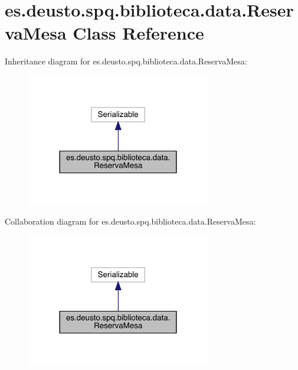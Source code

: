 \hypertarget{classes_1_1deusto_1_1spq_1_1biblioteca_1_1data_1_1_reserva_mesa}{}\section{es.\+deusto.\+spq.\+biblioteca.\+data.\+Reserva\+Mesa Class Reference}
\label{classes_1_1deusto_1_1spq_1_1biblioteca_1_1data_1_1_reserva_mesa}


Inheritance diagram for es.\+deusto.\+spq.\+biblioteca.\+data.\+Reserva\+Mesa\+:
\nopagebreak
\begin{figure}[H]
\begin{center}
\leavevmode
\includegraphics[width=228pt]{classes_1_1deusto_1_1spq_1_1biblioteca_1_1data_1_1_reserva_mesa__inherit__graph}
\end{center}
\end{figure}


Collaboration diagram for es.\+deusto.\+spq.\+biblioteca.\+data.\+Reserva\+Mesa\+:
\nopagebreak
\begin{figure}[H]
\begin{center}
\leavevmode
\includegraphics[width=228pt]{classes_1_1deusto_1_1spq_1_1biblioteca_1_1data_1_1_reserva_mesa__coll__graph}
\end{center}
\end{figure}
